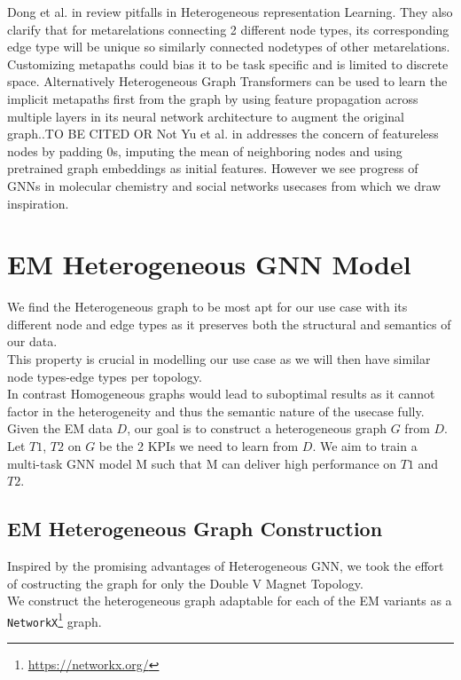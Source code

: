 \documentclass{report} %
\begin{document}
Dong et al. in \cite{HNRL-2020} review pitfalls in Heterogeneous representation Learning. They also clarify that for metarelations connecting 2 different node types,  
its corresponding edge type will be unique so similarly connected nodetypes of other metarelations. Customizing metapaths could bias it to be task specific and is limited to discrete space.
Alternatively Heterogeneous Graph Transformers can be used to learn the implicit metapaths first from the graph by using feature propagation across multiple layers in its 
neural network architecture to augment the original graph..TO BE CITED OR Not
Yu et al. in \cite{SHGNN-2020} addresses the concern of featureless nodes by padding 0s, imputing the mean of neighboring nodes and using pretrained graph embeddings as initial features.
However we see progress of \ac{GNN}s in molecular chemistry and social networks usecases from which we draw inspiration.
\section{\ac{EM} Heterogeneous \ac{GNN} Model}\label{sec:EM Heterogeneous GNN Model}
We find the Heterogeneous graph to be most apt for our use case with its different node and edge types as it preserves both the structural and semantics of our data. \\
This property is crucial in modelling our use case as we will then have similar node types-edge types per topology. \\
In contrast Homogeneous graphs would lead to suboptimal results as it cannot factor in the heterogeneity and thus the semantic nature of the usecase fully. \\

Given the \ac{EM} data \( D\), our goal is to construct a heterogeneous graph \( G\) from \( D\). Let \( T1\), \( T2\) on \( G\) be the 2 \ac{KPI}s we need to learn from \( D\). 
We aim to train a multi-task \ac{GNN} model M such that M can deliver high performance on \( T1\) and \( T2\).

\subsection{\ac{EM} Heterogeneous Graph Construction}\label{subsec:EM Heterogeneous Graph Construction}
Inspired by the promising advantages of Heterogeneous \ac{GNN}, we took the effort of costructing the graph for only the Double V Magnet Topology.\\
We construct the heterogeneous graph adaptable for each of the \ac{EM} variants as a \texttt{NetworkX}\footnote{\url{https://networkx.org/}} graph.
\end{document}
